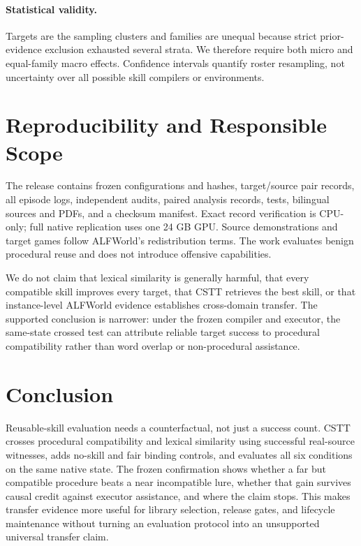 \documentclass[10pt]{article}
\begin{document}
\paragraph{Statistical validity.}
Targets are the sampling clusters and families are unequal because strict prior-
evidence exclusion exhausted several strata. We therefore require both micro
and equal-family macro effects. Confidence intervals quantify roster
resampling, not uncertainty over all possible skill compilers or environments.

\section{Reproducibility and Responsible Scope}
The release contains frozen configurations and hashes, target/source pair
records, all episode logs, independent audits, paired analysis records, tests,
bilingual sources and PDFs, and a checksum manifest. Exact record verification
is CPU-only; full native replication uses one 24 GB GPU. Source demonstrations
and target games follow ALFWorld's redistribution terms. The work evaluates
benign procedural reuse and does not introduce offensive capabilities.

We do not claim that lexical similarity is generally harmful, that every
compatible skill improves every target, that CSTT retrieves the best skill, or
that instance-level ALFWorld evidence establishes cross-domain transfer. The
supported conclusion is narrower: under the frozen compiler and executor, the
same-state crossed test can attribute reliable target success to procedural
compatibility rather than word overlap or non-procedural assistance.

\section{Conclusion}
Reusable-skill evaluation needs a counterfactual, not just a success count.
CSTT crosses procedural compatibility and lexical similarity using successful
real-source witnesses, adds no-skill and fair binding controls, and evaluates
all six conditions on the same native state. The frozen confirmation shows
whether a far but compatible procedure beats a near incompatible lure, whether
that gain survives causal credit against executor assistance, and where the
claim stops. This makes transfer evidence more useful for library selection,
release gates, and lifecycle maintenance without turning an evaluation protocol
into an unsupported universal transfer claim.



\end{document}
